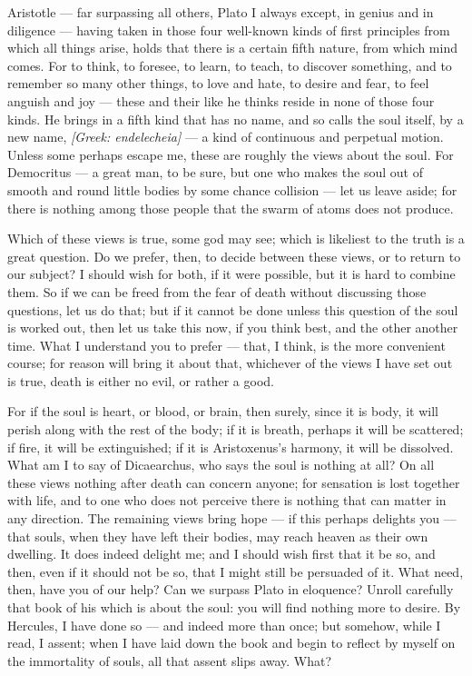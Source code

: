  Aristotle — far surpassing all others, Plato I always except, in genius and in diligence — having taken in those four well-known kinds of first principles from which all things arise, holds that there is a certain fifth nature, from which mind comes. For to think, to foresee, to learn, to teach, to discover something, and to remember so many other things, to love and hate, to desire and fear, to feel anguish and joy — these and their like he thinks reside in none of those four kinds. He brings in a fifth kind that has no name, and so calls the soul itself, by a new name, \textit{[Greek: endelecheia]} — a kind of continuous and perpetual motion. Unless some perhaps escape me, these are roughly the views about the soul. For Democritus — a great man, to be sure, but one who makes the soul out of smooth and round little bodies by some chance collision — let us leave aside; for there is nothing among those people that the swarm of atoms does not produce.

 Which of these views is true, some god may see; which is likeliest to the truth is a great question. Do we prefer, then, to decide between these views, or to return to our subject? I should wish for both, if it were possible, but it is hard to combine them. So if we can be freed from the fear of death without discussing those questions, let us do that; but if it cannot be done unless this question of the soul is worked out, then let us take this now, if you think best, and the other another time. What I understand you to prefer — that, I think, is the more convenient course; for reason will bring it about that, whichever of the views I have set out is true, death is either no evil, or rather a good.

 For if the soul is heart, or blood, or brain, then surely, since it is body, it will perish along with the rest of the body; if it is breath, perhaps it will be scattered; if fire, it will be extinguished; if it is Aristoxenus's harmony, it will be dissolved. What am I to say of Dicaearchus, who says the soul is nothing at all? On all these views nothing after death can concern anyone; for sensation is lost together with life, and to one who does not perceive there is nothing that can matter in any direction. The remaining views bring hope — if this perhaps delights you — that souls, when they have left their bodies, may reach heaven as their own dwelling. It does indeed delight me; and I should wish first that it be so, and then, even if it should not be so, that I might still be persuaded of it. What need, then, have you of our help? Can we surpass Plato in eloquence? Unroll carefully that book of his which is about the soul: you will find nothing more to desire. By Hercules, I have done so — and indeed more than once; but somehow, while I read, I assent; when I have laid down the book and begin to reflect by myself on the immortality of souls, all that assent slips away. What?

